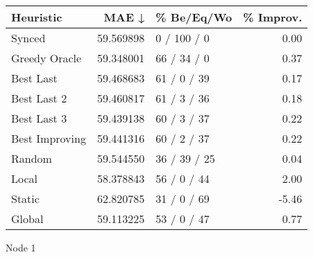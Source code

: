 \begin{tabular}{lrlr}
\toprule
      Heuristic &      MAE ↓ &    \% Be/Eq/Wo & \% Improv. \\
\midrule
         Synced &  59.569898 &   0 / 100 / 0 &      0.00 \\
  Greedy Oracle &  59.348001 &   66 / 34 / 0 &      0.37 \\
      Best Last &  59.468683 &   61 / 0 / 39 &      0.17 \\
    Best Last 2 &  59.460817 &   61 / 3 / 36 &      0.18 \\
    Best Last 3 &  59.439138 &   60 / 3 / 37 &      0.22 \\
 Best Improving &  59.441316 &   60 / 2 / 37 &      0.22 \\
         Random &  59.544550 &  36 / 39 / 25 &      0.04 \\
          Local &  58.378843 &   56 / 0 / 44 &      2.00 \\
         Static &  62.820785 &   31 / 0 / 69 &     -5.46 \\
         Global &  59.113225 &   53 / 0 / 47 &      0.77 \\
\bottomrule
\end{tabular}
\caption{Node 1}
\label{tab:non_lr005_le1_bs2_1}
